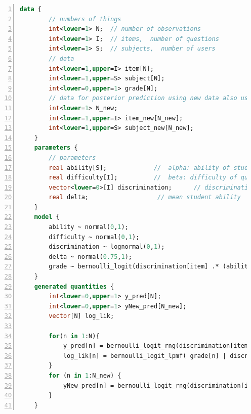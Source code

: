 \begin{lstlisting}[language=Stan,caption={Code Stan pour 2PL},basicstyle=\scriptsize, frame=lines,framesep=4.5mm,framexleftmargin=2.5mm,tabsize=2,numbers=left,fillcolor=\color{white},rulecolor=\color{black},numberstyle=\normalfont\scriptsize\color{black}]
    data {
        // numbers of things
        int<lower=1> N;  // number of observations
        int<lower=1> I;  // items,  number of questions  
        int<lower=1> S;  // subjects,  number of users 
        // data
        int<lower=1,upper=I> item[N];
        int<lower=1,upper=S> subject[N];
        int<lower=0,upper=1> grade[N];
        // data for posterior prediction using new data also used for Cross-validation
        int<lower=1> N_new;
        int<lower=1,upper=I> item_new[N_new];
        int<lower=1,upper=S> subject_new[N_new];
    }
    parameters {
        // parameters
        real ability[S];             //  alpha: ability of student
        real difficulty[I];          //  beta: difficulty of question
        vector<lower=0>[I] discrimination;      // discrimination of question
        real delta;                   // mean student ability
    }
    model {
        ability ~ normal(0,1);         
        difficulty ~ normal(0,1);   
        discrimination ~ lognormal(0,1);
        delta ~ normal(0.75,1);
        grade ~ bernoulli_logit(discrimination[item] .* (ability[subject] - (difficulty[item] + delta)));	
    }
    generated quantities {
        int<lower=0,upper=1> y_pred[N];
        int<lower=0,upper=1> yNew_pred[N_new];
        vector[N] log_lik;

        for(n in 1:N){
            y_pred[n] = bernoulli_logit_rng(discrimination[item[n]] * (ability[subject[n]] - (difficulty[item[n]] + delta)));
            log_lik[n] = bernoulli_logit_lpmf( grade[n] | discrimination[item[n]] * (ability[subject[n]] - (difficulty[item[n]] + delta)));
        }
        for (n in 1:N_new) {
            yNew_pred[n] = bernoulli_logit_rng(discrimination[item[n]] * (ability[subject_new[n]] - (difficulty[item_new[n]] + delta)));                             
        }
    }
\end{lstlisting}

\newpage

